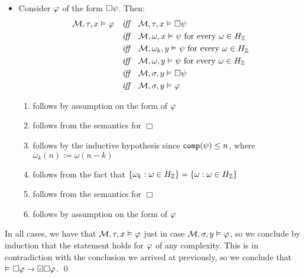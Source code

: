 \documentclass[a4paper, 11pt]{article}                  %
\begin{document}
\begin{enumerate}
{\begin{itemize}
          \item Consider $\varphi$ of the form $\Box\psi$. Then:
          \setcounter{equation}{0}
          \begin{align}
            \mathcal{M}, \tau, x \vDash_{} \varphi \quad \textit{iff}\quad & \mathcal{M}, \tau, x \vDash_{} \Box\psi\\
            \textit{iff}\quad & \mathcal{M}, \omega, x \vDash_{} \psi \text{ for every } \omega \in H_{\mathbb{Z}}\\
            \textit{iff}\quad & \mathcal{M}, \omega_k, y \vDash_{} \psi \text{ for every } \omega \in H_{\mathbb{Z}}\\
            \textit{iff}\quad & \mathcal{M}, \omega, y \vDash_{} \psi \text{ for every } \omega \in H_{\mathbb{Z}}\\
            \textit{iff}\quad & \mathcal{M}, \sigma, y \vDash_{} \Box\psi\\
            \textit{iff}\quad & \mathcal{M}, \sigma, y \vDash_{} \varphi
          \end{align}
          \begin{enumerate}[label=(\arabic*)]
            \item follows by assumption on the form of $\varphi$
            \item follows from the semantics for $\Box$
            \item follows by the inductive hypothesis since $\texttt{comp}(\psi) \le n$, where $\omega_k(n):=\omega(n - k)$
            \item follows from the fact that $\{\omega_k: \omega \in H_{\mathbb{Z}}\}=\{\omega: \omega \in H_{\mathbb{Z}}\}$
            \item follows from the semantics for $\Box$
            \item follows by assumption on the form of $\varphi$
          \end{enumerate}
        \end{itemize}

        In all cases, we have that $\mathcal{M}, \tau, x \vDash_{} \varphi$ just in case $\mathcal{M}, \sigma, y \vDash_{} \varphi$, so we conclude by induction that the statement holds for $\varphi$ of any complexity. This is in contradiction with the conclusion we arrived at previously, so we conclude that $\MLmodels \Box \metaA \to \Future \Box \metaA$. \qed
      }



\end{enumerate}
\end{document}
